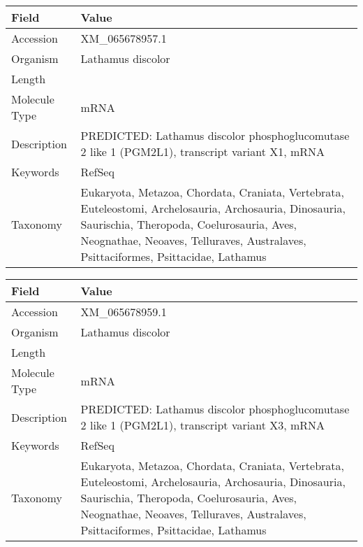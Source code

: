 \documentclass[10pt]{article}
\begin{document}
\vspace{1em}
{\footnotesize
\begin{longtable}{>{\raggedright\arraybackslash}p{4.5cm} >{\raggedright\arraybackslash}p{11.5cm}}
\textbf{Field} & \textbf{Value} \\
\hline
Accession & XM\_065678957.1 \\
Organism & Lathamus discolor \\
Length & 6388 \\
Molecule Type & mRNA \\
Description & PREDICTED: Lathamus discolor phosphoglucomutase 2 like 1 (PGM2L1), transcript variant X1, mRNA \\
Keywords & RefSeq \\
Taxonomy & Eukaryota, Metazoa, Chordata, Craniata, Vertebrata, Euteleostomi, Archelosauria, Archosauria, Dinosauria, Saurischia, Theropoda, Coelurosauria, Aves, Neognathae, Neoaves, Telluraves, Australaves, Psittaciformes, Psittacidae, Lathamus \\
\end{longtable}
}

\vspace{1em}
{\footnotesize
\begin{longtable}{>{\raggedright\arraybackslash}p{4.5cm} >{\raggedright\arraybackslash}p{11.5cm}}
\textbf{Field} & \textbf{Value} \\
\hline
Accession & XM\_065678959.1 \\
Organism & Lathamus discolor \\
Length & 2221 \\
Molecule Type & mRNA \\
Description & PREDICTED: Lathamus discolor phosphoglucomutase 2 like 1 (PGM2L1), transcript variant X3, mRNA \\
Keywords & RefSeq \\
Taxonomy & Eukaryota, Metazoa, Chordata, Craniata, Vertebrata, Euteleostomi, Archelosauria, Archosauria, Dinosauria, Saurischia, Theropoda, Coelurosauria, Aves, Neognathae, Neoaves, Telluraves, Australaves, Psittaciformes, Psittacidae, Lathamus \\
\end{longtable}
}
\end{document}
